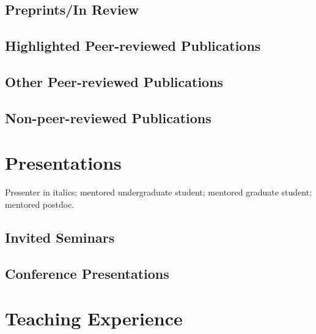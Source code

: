 \subsection*{Preprints/In Review}
\nocite{*}
\printbibliography[filter=cvsubmitted, heading=none]

\subsection*{Highlighted Peer-reviewed Publications}
\nocite{*}
\printbibliography[filter=highlightedpapersnopreprints, heading=none]

\subsection*{Other Peer-reviewed Publications}
\nocite{*}
\printbibliography[filter=cvpapersnohighlightsnopreprints, heading=none]

\subsection*{Non-peer-reviewed Publications}


\section*{Presentations}
Presenter in italics;
\ugsymbol{}mentored undergraduate student;
\phdsymbol{}mentored graduate student;
\postdocsymbol{}mentored postdoc.

\subsection*{Invited Seminars}
\nocite{*}
\printbibliography[filter=invitedpresentation, heading=none]

\subsection*{Conference Presentations}
\nocite{*}
\printbibliography[filter=presentation, heading=none]

\section*{Teaching Experience}


